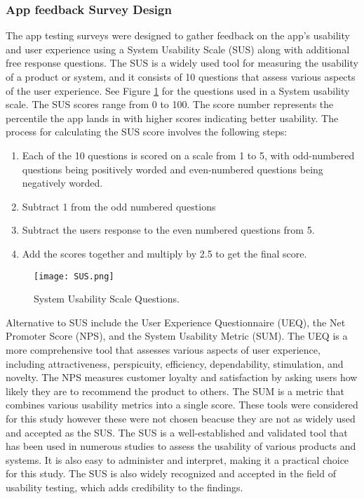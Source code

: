 \subsubsection{App feedback Survey Design} 

The app testing surveys were designed to gather feedback on the app's usability and user experience using a System Usability Scale (SUS) along with additional free response questions. The SUS is a widely used tool for measuring the usability of a product or system, and it consists of 10 questions that assess various aspects of the user experience\cite{Hyzy2022}. See Figure \ref{figure:sus} for the questions used in a System usability scale. The SUS scores range from 0 to 100. The score number represents the percentile the app lands in with higher scores indicating better usability. The process for calculating the SUS score involves the following steps:
\begin{enumerate}
  \item Each of the 10 questions is scored on a scale from 1 to 5, with odd-numbered questions being positively worded and even-numbered questions being negatively worded.
  \item Subtract 1 from the odd numbered questions 
  \item Subtract the users response to the even numbered questions from 5.
  \item Add the scores together and multiply by 2.5 to get the final score.
\end{enumerate}

\begin{figure}[h!!]
  \begin{center}
    \texttt{[image: SUS.png]}
    \caption{System Usability Scale Questions.}
    \label{figure:sus}
  \end{center}
\end{figure}

Alternative to SUS include the User Experience Questionnaire (UEQ), the Net Promoter Score (NPS), and the System Usability Metric (SUM). The UEQ is a more comprehensive tool that assesses various aspects of user experience, including attractiveness, perspicuity, efficiency, dependability, stimulation, and novelty. The NPS measures customer loyalty and satisfaction by asking users how likely they are to recommend the product to others. The SUM is a metric that combines various usability metrics into a single score. These tools were considered for this study however these were not chosen beacuse they are not as widely used and accepted as the SUS. The SUS is a well-established and validated tool that has been used in numerous studies to assess the usability of various products and systems. It is also easy to administer and interpret, making it a practical choice for this study. The SUS is also widely recognized and accepted in the field of usability testing, which adds credibility to the findings.

